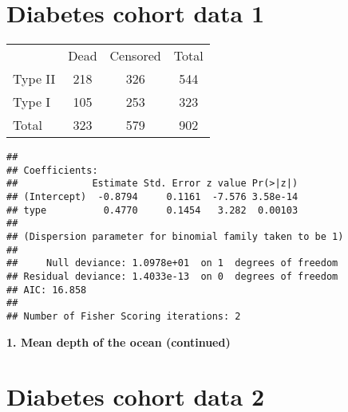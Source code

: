 \documentclass[10pt]{beamer}\usepackage[]{graphicx}\usepackage[]{color}
\makeatletter
\newenvironment{kframe}{%
 \def\at@end@of@kframe{}%
 \ifinner\ifhmode%
  \def\at@end@of@kframe{\end{minipage}}%
  \begin{minipage}{\columnwidth}%
 \fi\fi%
 \def\FrameCommand##1{\hskip\@totalleftmargin \hskip-\fboxsep
 \colorbox{shadecolor}{##1}\hskip-\fboxsep
     \hskip-\linewidth \hskip-\@totalleftmargin \hskip\columnwidth}%
 \MakeFramed {\advance\hsize-\width
   \@totalleftmargin\z@ \linewidth\hsize
   \@setminipage}}%
 {\par\unskip\endMakeFramed%
 \at@end@of@kframe}
\newenvironment{knitrout}{}{} %
\makeatother
\begin{document}
\section{Diabetes cohort data 1}

\begin{frame}
	\vspace{-1.31in}
	\tiny
\begin{table}[h]
	\centering
	\begin{tabular}{lcc|c}
		& Dead &  Censored & Total\\
		Type II & 218 & 326 & 544 \\
		Type I & 105 & 253 & 323 \\
		\hline
		Total & 323 & 579 & 902
	\end{tabular}
\end{table}

	\vspace{-.21in}
\begin{knitrout}\tiny
{}\color{fgcolor}\begin{kframe}
\begin{verbatim}
## 
## Coefficients:
##             Estimate Std. Error z value Pr(>|z|)
## (Intercept)  -0.8794     0.1161  -7.576 3.58e-14
## type          0.4770     0.1454   3.282  0.00103
## 
## (Dispersion parameter for binomial family taken to be 1)
## 
##     Null deviance: 1.0978e+01  on 1  degrees of freedom
## Residual deviance: 1.4033e-13  on 0  degrees of freedom
## AIC: 16.858
## 
## Number of Fisher Scoring iterations: 2
\end{verbatim}
\end{kframe}
\end{knitrout}
\end{frame}


\begin{frame}
	\vspace*{-5.0in}
	\textbf{1. Mean depth of the ocean (continued)}
	
\end{frame}

\section{Diabetes cohort data 2}
\end{document}
